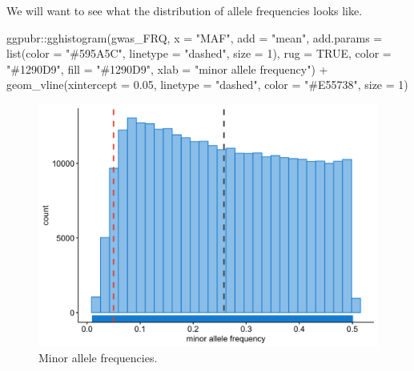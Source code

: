 \documentclass[
]{book}
\newenvironment{Shaded}{\begin{snugshade}}{\end{snugshade}}
\newcommand{\AttributeTok}[1]{\textcolor[rgb]{0.77,0.63,0.00}{#1}}
\newcommand{\ConstantTok}[1]{\textcolor[rgb]{0.00,0.00,0.00}{#1}}
\newcommand{\DecValTok}[1]{\textcolor[rgb]{0.00,0.00,0.81}{#1}}
\newcommand{\FloatTok}[1]{\textcolor[rgb]{0.00,0.00,0.81}{#1}}
\newcommand{\FunctionTok}[1]{\textcolor[rgb]{0.00,0.00,0.00}{#1}}
\newcommand{\NormalTok}[1]{#1}
\newcommand{\SpecialCharTok}[1]{\textcolor[rgb]{0.00,0.00,0.00}{#1}}
\newcommand{\StringTok}[1]{\textcolor[rgb]{0.31,0.60,0.02}{#1}}
\begin{document}
We will want to see what the distribution of allele frequencies looks like.

\begin{Shaded}
\begin{Highlighting}[]
\NormalTok{ggpubr}\SpecialCharTok{::}\FunctionTok{gghistogram}\NormalTok{(gwas\_FRQ, }\AttributeTok{x =} \StringTok{"MAF"}\NormalTok{,}
                    \AttributeTok{add =} \StringTok{"mean"}\NormalTok{, }\AttributeTok{add.params =} \FunctionTok{list}\NormalTok{(}\AttributeTok{color =} \StringTok{"\#595A5C"}\NormalTok{, }\AttributeTok{linetype =} \StringTok{"dashed"}\NormalTok{, }\AttributeTok{size =} \DecValTok{1}\NormalTok{),}
                    \AttributeTok{rug =} \ConstantTok{TRUE}\NormalTok{,}
                    \AttributeTok{color =} \StringTok{"\#1290D9"}\NormalTok{, }\AttributeTok{fill =} \StringTok{"\#1290D9"}\NormalTok{,}
                    \AttributeTok{xlab =} \StringTok{"minor allele frequency"}\NormalTok{) }\SpecialCharTok{+}
  \FunctionTok{geom\_vline}\NormalTok{(}\AttributeTok{xintercept =} \FloatTok{0.05}\NormalTok{, }\AttributeTok{linetype =} \StringTok{"dashed"}\NormalTok{,}
                \AttributeTok{color =} \StringTok{"\#E55738"}\NormalTok{, }\AttributeTok{size =} \DecValTok{1}\NormalTok{)}
\end{Highlighting}
\end{Shaded}

\begin{figure}

{\centering \includegraphics[width=18.67in]{img/_gwas/show-freq-gwas} 

}

\caption{Minor allele frequencies.}\label{fig:show-freq-gwas}
\end{figure}
\end{document}
